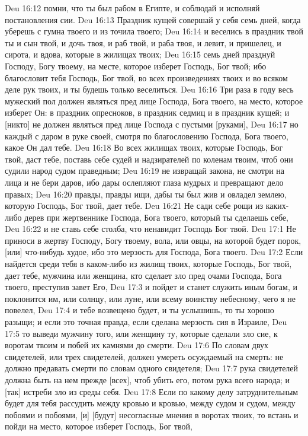 Deu 16:12  помни, что ты был рабом в Египте, и соблюдай и исполняй постановления сии.
Deu 16:13  Праздник кущей совершай у себя семь дней, когда уберешь с гумна твоего и из точила твоего;
Deu 16:14  и веселись в праздник твой ты и сын твой, и дочь твоя, и раб твой, и раба твоя, и левит, и пришелец, и сирота, и вдова, которые в жилищах твоих;
Deu 16:15  семь дней празднуй Господу, Богу твоему, на месте, которое изберет Господь, Бог твой; ибо благословит тебя Господь, Бог твой, во всех произведениях твоих и во всяком деле рук твоих, и ты будешь только веселиться.
Deu 16:16  Три раза в году весь мужеский пол должен являться пред лице Господа, Бога твоего, на место, которое изберет Он: в праздник опресноков, в праздник седмиц и в праздник кущей; и [никто] не должен являться пред лице Господа с пустыми [руками],
Deu 16:17  но каждый с даром в руке своей, смотря по благословению Господа, Бога твоего, какое Он дал тебе.
Deu 16:18  Во всех жилищах твоих, которые Господь, Бог твой, даст тебе, поставь себе судей и надзирателей по коленам твоим, чтоб они судили народ судом праведным;
Deu 16:19  не извращай закона, не смотри на лица и не бери даров, ибо дары ослепляют глаза мудрых и превращают дело правых;
Deu 16:20  правды, правды ищи, дабы ты был жив и овладел землею, которую Господь, Бог твой, дает тебе.
Deu 16:21  Не сади себе рощи из каких-либо дерев при жертвеннике Господа, Бога твоего, который ты сделаешь себе,
Deu 16:22  и не ставь себе столба, что ненавидит Господь Бог твой.
Deu 17:1  Не приноси в жертву Господу, Богу твоему, вола, или овцы, на которой будет порок, [или] что-нибудь худое, ибо это мерзость для Господа, Бога твоего.
Deu 17:2  Если найдется среди тебя в каком-либо из жилищ твоих, которые Господь, Бог твой, дает тебе, мужчина или женщина, кто сделает зло пред очами Господа, Бога твоего, преступив завет Его,
Deu 17:3  и пойдет и станет служить иным богам, и поклонится им, или солнцу, или луне, или всему воинству небесному, чего я не повелел,
Deu 17:4  и тебе возвещено будет, и ты услышишь, то ты хорошо разыщи; и если это точная правда, если сделана мерзость сия в Израиле,
Deu 17:5  то выведи мужчину того, или женщину ту, которые сделали зло сие, к воротам твоим и побей их камнями до смерти.
Deu 17:6  По словам двух свидетелей, или трех свидетелей, должен умереть осуждаемый на смерть: не должно предавать смерти по словам одного свидетеля;
Deu 17:7  рука свидетелей должна быть на нем прежде [всех], чтоб убить его, потом рука всего народа; и [так] истреби зло из среды себя.
Deu 17:8  Если по какому делу затруднительным будет для тебя рассудить между кровью и кровью, между судом и судом, между побоями и побоями, [и] [будут] несогласные мнения в воротах твоих, то встань и пойди на место, которое изберет Господь, Бог твой,
